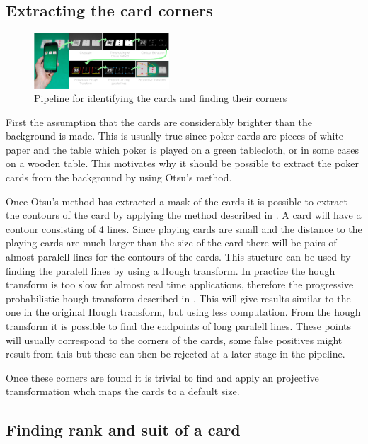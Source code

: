 \documentclass[journal,twoside]{IEEEtran}
\begin{document}
\subsection{Extracting the card corners}

\begin{figure}[placement h]
\centering
\includegraphics[width=0.45\textwidth]{images/detection.png}
\caption{Pipeline for identifying the cards and finding their corners}
\label{fig:CornerOutline}
\end{figure}

First the assumption that the cards are considerably brighter than the background is made. This is usually true since poker cards are pieces of white paper and the table which poker is played on a green tablecloth, or in some cases on a wooden table.
This motivates why it should be possible to extract the poker cards from the background by using Otsu's method\cite{OTSU}.

Once Otsu's method has extracted a mask of the cards it is possible to extract the contours of the card by applying the method described in \cite{CONTOURS}. A card will have a contour consisting of 4 lines. Since playing cards are small and the distance to the playing cards are much larger than the size of the card there will be pairs of almost paralell lines for the contours of the cards. This stucture can be used by finding the paralell lines by using a Hough transform. In practice the hough transform is too slow for almost real time applications, therefore the progressive probabilistic hough transform described in \cite{HoughP}, This will give results similar to the one in the original Hough transform, but using less computation. From the hough transform it is possible to find the endpoints of long paralell lines. These points will usually correspond to the corners of the cards, some false positives might result from this but these can then be rejected at a later stage in the pipeline.

Once these corners are found it is trivial to find and apply an projective transformation whch maps the cards to a default size.

\subsection{Finding rank and suit of a card}
\end{document}
